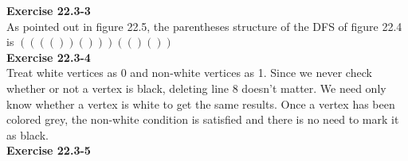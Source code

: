 \documentclass{article}
\begin{document}
\noindent\textbf{Exercise 22.3-3}\\

As pointed out in figure 22.5, the parentheses structure of the DFS of figure 22.4 is $(((())()))(()())$\\

\noindent\textbf{Exercise 22.3-4}\\

Treat white vertices as 0 and non-white vertices as 1.  Since we never check whether or not a vertex is black, deleting line 8 doesn't matter.  We need only know whether a vertex is white to get the same results.  Once a vertex has been colored grey, the non-white condition is satisfied and there is no need to mark it as black.  \\

\noindent\textbf{Exercise 22.3-5}\\
\end{document}
